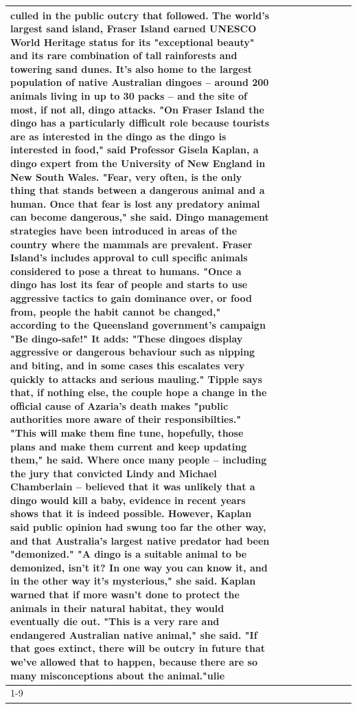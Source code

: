 \begin{table}[H]
\begin{tabular}{lllrlllll}
culled in the public outcry that followed. The world's largest sand island, Fraser Island earned UNESCO World Heritage status for its "exceptional beauty" and its rare combination of tall rainforests and towering sand dunes. It's also home to the largest population of native Australian dingoes -- around 200 animals living in up to 30 packs -- and the site of most, if not all, dingo attacks. "On Fraser Island the dingo has a particularly difficult role because tourists are as interested in the dingo as the dingo is interested in food," said Professor Gisela Kaplan, a dingo expert from the University of New England in New South Wales. "Fear, very often, is the only thing that stands between a dangerous animal and a human. Once that fear is lost any predatory animal can become dangerous," she said. Dingo management strategies have been introduced in areas of the country where the mammals are prevalent. Fraser Island's includes approval to cull specific animals considered to pose a threat to humans. "Once a dingo has lost its fear of people and starts to use aggressive tactics to gain dominance over, or food from, people the habit cannot be changed," according to the Queensland government's campaign "Be dingo-safe!" It adds: "These dingoes display aggressive or dangerous behaviour such as nipping and biting, and in some cases this escalates very quickly to attacks and serious mauling." Tipple says that, if nothing else, the couple hope a change in the official cause of Azaria's death makes "public authorities more aware of their responsibilties." "This will make them fine tune, hopefully, those plans and make them current and keep updating them," he said. Where once many people -- including the jury that convicted Lindy and Michael Chamberlain -- believed that it was unlikely that a dingo would kill a baby, evidence in recent years shows that it is indeed possible. However, Kaplan said public opinion had swung too far the other way, and that Australia's largest native predator had been "demonized." "A dingo is a suitable animal to be demonized, isn't it? In one way you can know it, and in the other way it's mysterious," she said. Kaplan warned that if more wasn't done to protect the animals in their natural habitat, they would eventually die out. "This is a very rare and endangered Australian native animal," she said. "If that goes extinct, there will be outcry in future that we've allowed that to happen, because there are so many misconceptions about the animal."ulie \\
\cline{1-9}

\end{tabular}
\end{table}
